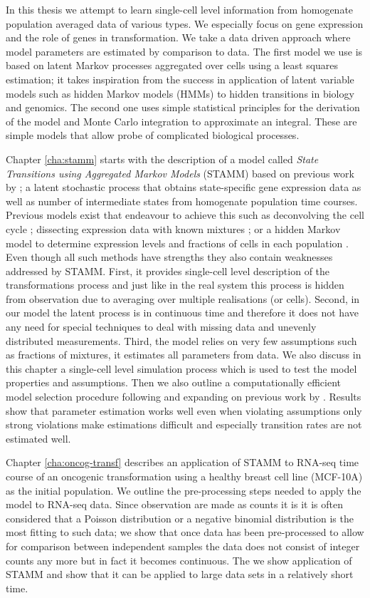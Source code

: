 In this thesis we attempt to learn single-cell level information from homogenate population averaged data of various types. We especially focus on gene expression and the role of genes in transformation. We take a data driven approach where model parameters are estimated by comparison to data. The first model we use is based on latent Markov processes aggregated over cells using a least squares estimation; it takes inspiration from the success in application of latent variable models such as hidden Markov models (HMMs) to hidden transitions in biology and genomics. The second one uses simple statistical principles for the derivation of the model and Monte Carlo integration to approximate an integral. These are simple models that allow probe of complicated biological processes.
 
Chapter \ref{cha:stamm} starts with the description of a model called \emph{State Transitions using Aggregated Markov Models} (STAMM) based on previous work by \cite{Armond:2013}; a latent stochastic process that obtains state-specific gene expression data as well as number of intermediate states from homogenate population time courses. Previous models exist that endeavour to achieve this such as deconvolving the cell cycle \citep{Bar-Joseph04082004}; dissecting expression data with known mixtures \citep{Lahdesmaki:2005fh}; or a hidden Markov model to determine expression levels and fractions of cells in each population \citep{Roy:2006ik}. Even though all such methods have strengths they also contain weaknesses addressed by STAMM. First, it provides single-cell level description of the transformations process and just like in the real system this process is hidden from observation due to averaging over multiple realisations (or cells). Second, in our model the latent process is in continuous time and therefore it does not have any need for special techniques to deal with missing data and unevenly distributed measurements. Third, the model relies on very few assumptions such as fractions of mixtures, it estimates all parameters from data. We also discuss in this chapter a single-cell level simulation process which is used to test the model properties and assumptions. Then we also outline a computationally efficient model selection procedure following and expanding on previous work by \cite{Armond:2013}. Results show that parameter estimation works well even when violating assumptions only strong violations make estimations difficult and especially transition rates are not estimated well. 

Chapter \ref{cha:oncog-transf} describes an application of STAMM to RNA-seq time course of an oncogenic transformation using a healthy breast cell line (MCF-10A) as the initial population. We outline the pre-processing steps needed to apply the model to RNA-seq data. Since observation are made as counts it is it is often considered that a Poisson distribution or a negative binomial distribution is the most fitting to such data; we show that once data has been pre-processed to allow for comparison between independent samples the data does not consist of integer counts any more but in fact it becomes continuous. The we show application of STAMM and show that it can be applied to large data sets in a relatively short time.

